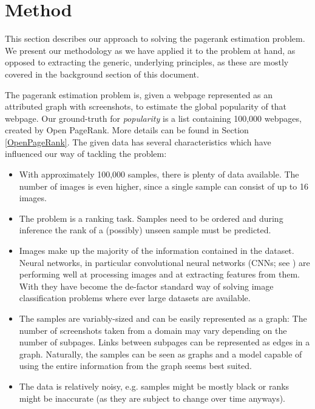 \section{Method}

This section describes our approach to solving the pagerank estimation problem. We present our methodology as we have applied it to the problem at hand, as opposed to extracting the generic, underlying principles, as these are mostly covered in the background section of this document.

The pagerank estimation problem is, given a webpage represented as an attributed graph with screenshots, to estimate the global popularity of that webpage.
Our ground-truth for \textit{popularity} is a list containing 100,000 webpages, created by Open PageRank.
More details can be found in Section \ref{OpenPageRank}.
The given data has several characteristics which have influenced our way of tackling the problem:

\begin{itemize}
    \item With approximately 100,000 samples, there is plenty of data available. The number of images is even higher, since a single sample can consist of up to 16 images.
    \item The problem is a ranking task. Samples need to be ordered and during inference the rank of a (possibly) unseen sample must be predicted.
    \item Images make up the majority of the information contained in the dataset. Neural networks, in particular convolutional neural networks (CNNs; see \cite{lecun1989backpropagation}) are performing well at processing images and at extracting features from them. With \cite{krizhevsky:imagenet} they have become the de-factor standard way of solving image classification problems where ever large datasets are available.
    \item The samples are variably-sized and can be easily represented as a graph: The number of screenshots taken from a domain may vary depending on the number of subpages. Links between subpages can be represented as edges in a graph. Naturally, the samples can be seen as graphs and a model capable of using the entire information from the graph seems best suited.
    \item The data is relatively noisy, e.g. samples might be mostly black or ranks might be inaccurate (as they are subject to change over time anyways).
\end{itemize}

